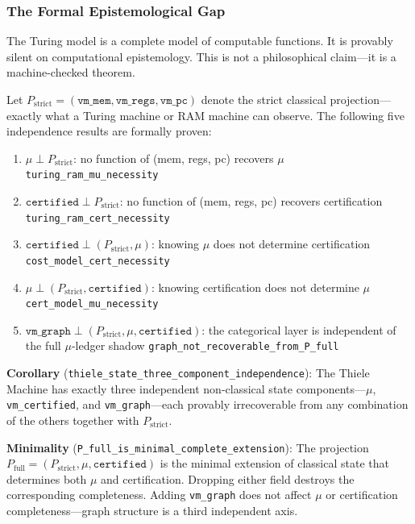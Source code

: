 \subsubsection{The Formal Epistemological Gap}

The Turing model is a complete model of computable functions. It is provably silent on computational epistemology. This is not a philosophical claim---it is a machine-checked theorem.

\begin{tcolorbox}[colback=red!5!white,colframe=red!75!black,title=\textbf{Complete Independence Classification (Proven in Coq, Zero Admits)}]
Let $P_{\text{strict}} = (\texttt{vm\_mem}, \texttt{vm\_regs}, \texttt{vm\_pc})$ denote the strict classical projection---exactly what a Turing machine or RAM machine can observe. The following five independence results are formally proven:

\begin{enumerate}
    \item $\mu \perp P_{\text{strict}}$: no function of (mem, regs, pc) recovers $\mu$ \hfill \texttt{turing\_ram\_mu\_necessity}
    \item $\texttt{certified} \perp P_{\text{strict}}$: no function of (mem, regs, pc) recovers certification \hfill \texttt{turing\_ram\_cert\_necessity}
    \item $\texttt{certified} \perp (P_{\text{strict}}, \mu)$: knowing $\mu$ does not determine certification \hfill \texttt{cost\_model\_cert\_necessity}
    \item $\mu \perp (P_{\text{strict}}, \texttt{certified})$: knowing certification does not determine $\mu$ \hfill \texttt{cert\_model\_mu\_necessity}
    \item $\texttt{vm\_graph} \perp (P_{\text{strict}}, \mu, \texttt{certified})$: the categorical layer is independent of the full $\mu$-ledger shadow \hfill \texttt{graph\_not\_recoverable\_from\_P\_full}
\end{enumerate}

\textbf{Corollary} (\texttt{thiele\_state\_three\_component\_independence}): The Thiele Machine has exactly three independent non-classical state components---$\mu$, \texttt{vm\_certified}, and \texttt{vm\_graph}---each provably irrecoverable from any combination of the others together with $P_{\text{strict}}$.

\textbf{Minimality} (\texttt{P\_full\_is\_minimal\_complete\_extension}): The projection $P_{\text{full}} = (P_{\text{strict}}, \mu, \texttt{certified})$ is the minimal extension of classical state that determines both $\mu$ and certification. Dropping either field destroys the corresponding completeness. Adding \texttt{vm\_graph} does not affect $\mu$ or certification completeness---graph structure is a third independent axis.
\end{tcolorbox}

